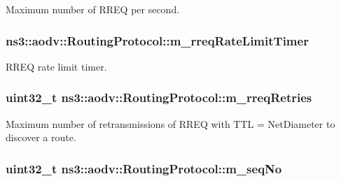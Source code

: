 Maximum number of R\+R\+EQ per second. 

\subsubsection[{\texorpdfstring{m\+\_\+rreq\+Rate\+Limit\+Timer}{m_rreqRateLimitTimer}}]{ ns3\+::aodv\+::\+Routing\+Protocol\+::m\+\_\+rreq\+Rate\+Limit\+Timer\hspace{0.3cm}{\ttfamily [private]}}\hypertarget{classns3_1_1aodv_1_1RoutingProtocol_ac8ad71cc3349d46b7740f59dd18b91b0}{}\label{classns3_1_1aodv_1_1RoutingProtocol_ac8ad71cc3349d46b7740f59dd18b91b0}


R\+R\+EQ rate limit timer. 

\subsubsection[{\texorpdfstring{m\+\_\+rreq\+Retries}{m_rreqRetries}}]{\setlength{\rightskip}{0pt plus 5cm}uint32\+\_\+t ns3\+::aodv\+::\+Routing\+Protocol\+::m\+\_\+rreq\+Retries\hspace{0.3cm}{\ttfamily [private]}}\hypertarget{classns3_1_1aodv_1_1RoutingProtocol_abecbe245cb328bc299a47f9a8a89aa6e}{}\label{classns3_1_1aodv_1_1RoutingProtocol_abecbe245cb328bc299a47f9a8a89aa6e}


Maximum number of retransmissions of R\+R\+EQ with T\+TL = Net\+Diameter to discover a route. 

\subsubsection[{\texorpdfstring{m\+\_\+seq\+No}{m_seqNo}}]{\setlength{\rightskip}{0pt plus 5cm}uint32\+\_\+t ns3\+::aodv\+::\+Routing\+Protocol\+::m\+\_\+seq\+No\hspace{0.3cm}{\ttfamily [private]}}\hypertarget{classns3_1_1aodv_1_1RoutingProtocol_abf5ef6b30d0ccf20b9b5ecf7918f67b2}{}\label{classns3_1_1aodv_1_1RoutingProtocol_abf5ef6b30d0ccf20b9b5ecf7918f67b2}


